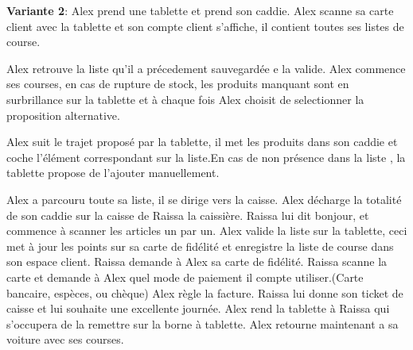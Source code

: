 \item {\bf Variante 2}:
Alex prend une tablette et prend son caddie.
Alex scanne sa carte client avec la tablette et son compte client s'affiche, il contient toutes ses listes de course. 
\par
Alex retrouve la liste qu'il a précedement sauvegardée e la valide.
Alex commence ses courses, en cas de rupture de stock, les produits manquant sont en surbrillance sur la tablette et à chaque fois Alex choisit de selectionner la proposition alternative.
\par

Alex suit le trajet proposé par la tablette, il met les produits dans son caddie et coche l'élément correspondant sur la liste.En cas de non présence dans la liste , la tablette propose de l'ajouter manuellement.
\par

Alex a parcouru toute sa liste, il se dirige vers la caisse. 
Alex décharge la totalité de son caddie sur la caisse de Raissa la caissière.
Raissa lui dit bonjour, et commence à scanner les articles un par un.
Alex valide la liste sur la tablette, ceci met à jour les points sur sa carte de fidélité et enregistre la liste de course dans son espace client.
Raissa demande à Alex sa carte de fidélité.
Raissa scanne la carte et demande à Alex quel mode de paiement il compte utiliser.(Carte bancaire, espèces, ou chèque)
Alex règle la facture.
Raissa lui donne son ticket de caisse et lui souhaite une excellente journée.
Alex rend la tablette à Raissa qui s'occupera de la remettre sur la borne à tablette.
Alex retourne maintenant a sa voiture avec ses courses.
\stopitemize

